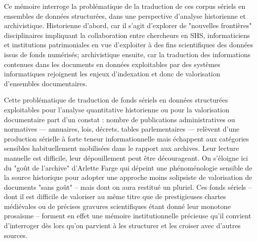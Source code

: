 Ce mémoire interroge la problématique de la traduction de ces corpus sériels en ensembles de données structurées, dans une perspective d’analyse historienne et archivistique. 
Historienne d'abord, car il s'agit d'explorer de "nouvelles frontières" disciplinaires impliquant la collaboration entre chercheurs en SHS, informaticiens et institutions patrimoniales en vue d'exploiter à des fins scientifiques des données issus de fonds numérisés; archivistique ensuite, car la traduction des informations contenues dans les documents en données exploitables par des systèmes informatiques rejoignent les enjeux d'indexation et donc de valorisation d'ensembles documentaires.

Cette problématique de traduction de fonds sériels en données structurées exploitables pour l'analyse quantitative historienne ou pour la valorisation documentaire part d’un constat : nombre de publications administratives ou normatives — annuaires, lois, décrets, tables parlementaires — relèvent d’une production sérielle à forte teneur informationnelle mais échappent aux catégories sensibles habituellement mobilisées dans le rapport aux archives. Leur lecture manuelle est difficile, leur dépouillement peut être décourageant. On s'éloigne ici du "goût de l'archive" d'Arlette Farge qui dépeint une phénoménologie sensible de la source historique pour adopter une approche moins solipsiste de valorisation de documents "sans goût" -- mais dont on aura restitué un pluriel. Ces fonds sériels -- dont il est difficile de valoriser au même titre que de prestigieuses chartes médiévales ou de précises gravures scientifiques étant donné leur monotone prosaïsme -- forment en effet une mémoire institutionnelle précieuse qu'il convient d'interroger dès lors qu’on parvient à les structurer et les croiser avec d’autres sources.

